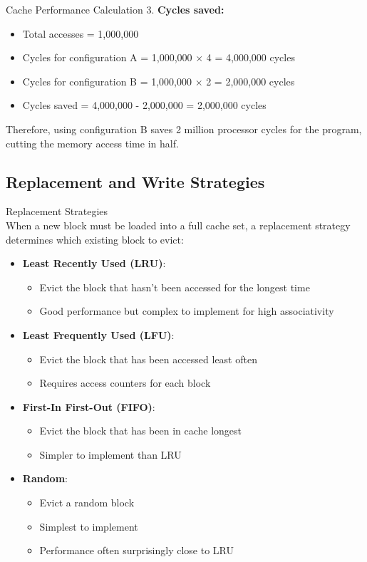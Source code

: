\begin{example2}{Cache Performance Calculation}
3. \textbf{Cycles saved:}
   \begin{itemize}
     \item Total accesses = 1,000,000
     \item Cycles for configuration A = 1,000,000 × 4 = 4,000,000 cycles
     \item Cycles for configuration B = 1,000,000 × 2 = 2,000,000 cycles
     \item Cycles saved = 4,000,000 - 2,000,000 = 2,000,000 cycles
   \end{itemize}

Therefore, using configuration B saves 2 million processor cycles for the program, cutting the memory access time in half.
\end{example2}

\subsection{Replacement and Write Strategies}


\begin{definition}{Replacement Strategies}\\
When a new block must be loaded into a full cache set, a replacement strategy determines which existing block to evict:
\begin{itemize}
    \item \textbf{Least Recently Used (LRU)}:
    \begin{itemize}
        \item Evict the block that hasn't been accessed for the longest time
        \item Good performance but complex to implement for high associativity
    \end{itemize}
    \item \textbf{Least Frequently Used (LFU)}:
    \begin{itemize}
        \item Evict the block that has been accessed least often
        \item Requires access counters for each block
    \end{itemize}
    \item \textbf{First-In First-Out (FIFO)}:
    \begin{itemize}
        \item Evict the block that has been in cache longest
        \item Simpler to implement than LRU
    \end{itemize}
    \item \textbf{Random}:
    \begin{itemize}
        \item Evict a random block
        \item Simplest to implement
        \item Performance often surprisingly close to LRU
    \end{itemize}
\end{itemize}
\end{definition}

